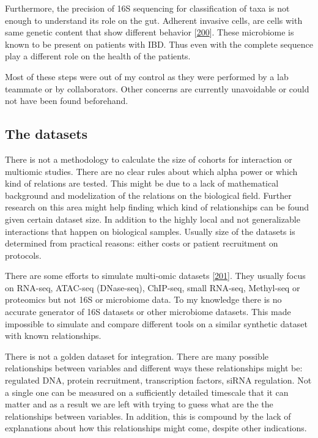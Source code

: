 \documentclass[
  a4paper,
]{book}
\begin{document}
Furthermore, the precision of 16S sequencing for classification of taxa is not enough to understand its role on the gut.
Adherent invasive cells, are cells with same genetic content that show different behavior {[}\protect\hyperlink{ref-nadalian2021}{200}{]}.
These microbiome is known to be present on patients with IBD.
Thus even with the complete sequence play a different role on the health of the patients.

Most of these steps were out of my control as they were performed by a lab teammate or by collaborators.
Other concerns are currently unavoidable or could not have been found beforehand.

\hypertarget{discussion-datasets}{%
\subsection{The datasets}\label{discussion-datasets}}

There is not a methodology to calculate the size of cohorts for interaction or multiomic studies.
There are no clear rules about which alpha power or which kind of relations are tested.
This might be due to a lack of mathematical background and modelization of the relations on the biological field.
Further research on this area might help finding which kind of relationships can be found given certain dataset size.
In addition to the highly local and not generalizable interactions that happen on biological samples.
Usually size of the datasets is determined from practical reasons: either costs or patient recruitment on protocols.

There are some efforts to simulate multi-omic datasets {[}\protect\hyperlink{ref-martuxednez-mira2018}{201}{]}.
They usually focus on RNA-seq, ATAC-seq (DNase-seq), ChIP-seq, small RNA-seq, Methyl-seq or proteomics but not 16S or microbiome data.
To my knowledge there is no accurate generator of 16S datasets or other microbiome datasets.
This made impossible to simulate and compare different tools on a similar synthetic dataset with known relationships.

There is not a golden dataset for integration.
There are many possible relationships between variables and different ways these relationships might be: regulated DNA, protein recruitment, transcription factors, siRNA regulation.
Not a single one can be measured on a sufficiently detailed timescale that it can matter and as a result we are left with trying to guess what are the the relationships between variables.
In addition, this is compound by the lack of explanations about how this relationships might come, despite other indications.
\end{document}
